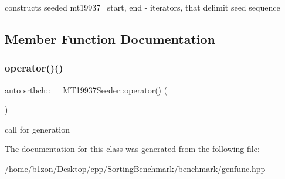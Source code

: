 constructs seeded mt19937~\newline
start, end -\/ iterators, that delimit seed sequence 

\subsection{Member Function Documentation}
\mbox{\label{classsrtbch_1_1____MT19937Seeder_a16d2acd54709058cbca46086f7bb5b84}} 
\subsubsection{\texorpdfstring{operator()()}{operator()()}}
{\footnotesize\ttfamily auto srtbch\+::\+\_\+\+\_\+\+M\+T19937\+Seeder\+::operator() (\begin{DoxyParamCaption}{ }\end{DoxyParamCaption})\hspace{0.3cm}{\ttfamily [inline]}}

call for generation 

The documentation for this class was generated from the following file\+:\begin{DoxyCompactItemize}
\item 
/home/b1zon/\+Desktop/cpp/\+Sorting\+Benchmark/benchmark/\hyperlink{genfunc_8hpp}{genfunc.\+hpp}\end{DoxyCompactItemize}
